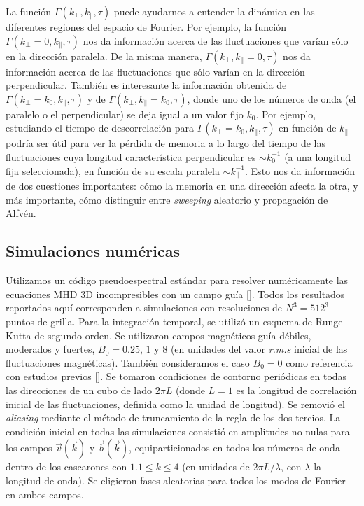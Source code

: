 La función $\Gamma(k_\perp,k_\parallel,\tau)$ puede ayudarnos a
entender la dinámica en las diferentes regiones del espacio de
Fourier. Por ejemplo, la función $\Gamma(k_\perp=0,k_\parallel,\tau)$
nos da información acerca de las fluctuaciones que varían sólo en la
dirección paralela.  De la misma manera,
$\Gamma(k_\perp,k_\parallel=0,\tau)$ nos da información acerca de las
fluctuaciones que sólo varían en la dirección perpendicular. También
es interesante la información obtenida de
$\Gamma(k_\perp=k_0,k_\parallel,\tau)$ y de
$\Gamma(k_\perp,k_\parallel=k_0,\tau)$, donde uno de los números de
onda (el paralelo o el perpendicular) se deja igual a un valor fijo
$k_0$. Por ejemplo, estudiando el tiempo de descorrelación para
$\Gamma(k_\perp=k_0,k_\parallel,\tau)$ en función de $k_\parallel$
podría ser útil para ver la pérdida de memoria a lo largo del tiempo
de las fluctuaciones cuya longitud característica perpendicular es
$\sim k_0^{-1}$ (a una longitud fija seleccionada), en función de su
escala paralela $\sim k_\parallel^{-1}$. Esto nos da información de
dos cuestiones importantes: cómo la memoria en una dirección afecta la
otra, y más importante, cómo distinguir entre \textit{sweeping}
aleatorio y propagación de Alfvén.


\subsection{Simulaciones numéricas}\label{sec3:NumSim}

Utilizamos un código pseudoespectral estándar para resolver
numéricamente las ecuaciones MHD 3D incompresibles con un campo guía
[\cite{gomez_parallel_2005, gomez_mhd_2005}]. Todos los resultados
reportados aquí corresponden a simulaciones con resoluciones de $N^3 =
512^3$ puntos de grilla. Para la integración temporal, se utilizó un
esquema de Runge-Kutta de segundo orden. Se utilizaron campos
magnéticos guía débiles, moderados y fuertes, $B_0 = 0.25$, $1$ y $8$
(en unidades del valor \textit{r.m.s} inicial de las fluctuaciones
magnéticas). También consideramos el caso $B_0 = 0$ como referencia
con estudios previos [\cite{servidio_time_2011}]. Se tomaron
condiciones de contorno periódicas en todas las direcciones de un cubo
de lado $2\pi L$ (donde $L = 1$ es la longitud de correlación inicial
de las fluctuaciones, definida como la unidad de longitud). Se
removió el \textit{aliasing} mediante el método de truncamiento de la
regla de los dos-tercios. La condición inicial en todas las simulaciones consistió en amplitudes
no nulas para los campos $\vec{v}(\vec{k})$ y $\vec{b}(\vec{k})$,
equiparticionados en todos los números de onda dentro de los
cascarones con $1.1 \leq k \leq 4$ (en unidades de $2\pi L/\lambda$,
con $\lambda$ la longitud de onda). Se eligieron fases aleatorias para
todos los modos de Fourier en ambos campos.

